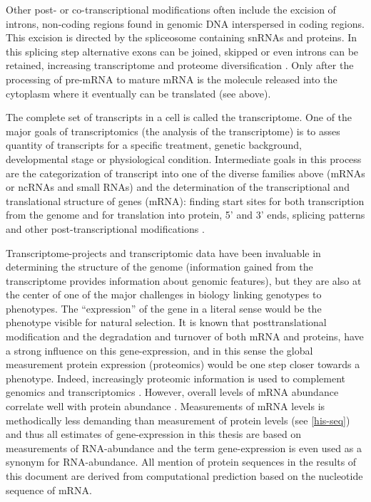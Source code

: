 Other post- or co-transcriptional modifications often include the
excision of introns, non-coding regions found in genomic DNA
interspersed in coding regions. This excision is directed by the
spliceosome containing snRNAs and proteins. In this splicing step
alternative exons can be joined, skipped or even introns can be
retained, increasing transcriptome and proteome diversification
\cite{pmid17158149}. Only after the processing of pre-mRNA to mature
mRNA is the molecule released into the cytoplasm where it eventually
can be translated (see above).

The complete set of transcripts in a cell is called the
transcriptome. One of the major goals of transcriptomics (the analysis
of the transcriptome) is to asses quantity of transcripts for a
specific treatment, genetic background, developmental stage or
physiological condition. Intermediate goals in this process are the
categorization of transcript into one of the diverse families above
(mRNAs or ncRNAs and small RNAs) and the determination of the
transcriptional and translational structure of genes (mRNA): finding
start sites for both transcription from the genome and for translation
into protein, 5' and 3' ends, splicing patterns and other
post-transcriptional modifications \cite{pmid19015660}.

Transcriptome-projects and transcriptomic data have been invaluable in
determining the structure of the genome (information gained from the
transcriptome provides information about genomic features), but they
are also at the center of one of the major challenges in biology
linking genotypes to phenotypes. The ``expression'' of the gene in a
literal sense would be the phenotype visible for natural selection. It
is known that posttranslational modification and the degradation and
turnover of both mRNA and proteins, have a strong influence on this
gene-expression, and in this sense the global measurement protein
expression (proteomics) would be one step closer towards a
phenotype. Indeed, increasingly proteomic information is used to
complement genomics and transcriptomics \cite{pmid20121477,
  pmid20237107}. However, overall levels of mRNA abundance correlate
well with protein abundance \cite{pmid21593866}. Measurements of mRNA
levels is methodically less demanding than measurement of protein
levels (see \ref{his-seq}) and thus all estimates of gene-expression
in this thesis are based on measurements of RNA-abundance and the term
gene-expression is even used as a synonym for RNA-abundance. All
mention of protein sequences in the results of this document are
derived from computational prediction based on the nucleotide sequence
of mRNA.


